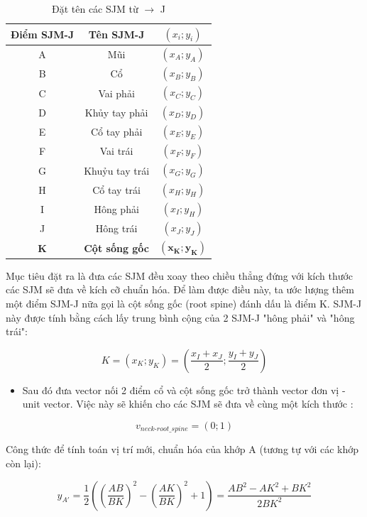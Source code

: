 \begin{table}[htp]
\centering
\caption{Đặt tên các SJM từ $\rightarrow$ J}
\begin{tabular}{|c|c|c|}
\hline 
 Điểm SJM-J & Tên SJM-J & $(x_i; y_i) $\\ 
\hline 
A & Mũi  & $(x_A; y_A)$ \\
\hline 
B & Cổ & $(x_B; y_B)$ \\ 
\hline 
C & Vai phải  & $(x_C; y_C)$ \\ 
\hline 
D & Khủy tay phải & $(x_D; y_D)$ \\ 
\hline 
E & Cổ tay phải & $(x_E; y_E)$ \\ 
\hline
F & Vai trái & $(x_F; y_F)$ \\ 
\hline
G & Khuỷu tay trái & $(x_G; y_G)$ \\ 
\hline
H & Cổ tay trái & $(x_H; y_H)$ \\ 
\hline
I &  Hông phải & $(x_I; y_H)$ \\
\hline
J & Hông trái & $(x_J; y_J)$ \\ 
\hline
\textbf{K} & \textbf{Cột sống gốc} & $\mathbf{(x_K; y_K)}$ \\ 
\hline
\end{tabular} 
\label{BangSJM}
\end{table}

Mục tiêu đặt ra là đưa các SJM đều xoay theo chiều thẳng đứng với kích thước các SJM sẽ đưa về kích cỡ chuẩn hóa. Để làm được điều này, ta ước lượng thêm một điểm SJM-J nữa gọi là cột sống gốc (root spine) đánh dấu là điểm K. SJM-J này được tính bằng cách lấy trung bình cộng của 2 SJM-J "hông phải" và "hông trái":

\begin{equation}
K = (x_K; y_K) = (\frac{x_I+x_J}{2};\frac{y_I+y_J}{2})
\end{equation}

\begin{itemize}
\item Sau đó đưa vector nối 2 điểm cổ và cột sống gốc trở thành vector đơn vị - unit vector. Việc này sẽ khiến cho các SJM sẽ đưa về cùng một kích thước :
\end{itemize}

\begin{equation}
v_\textit{neck-root\_spine} = (0;1)
\end{equation}

Công thức để tính toán vị trí mới, chuẩn hóa của khớp A (tương tự với các khớp còn lại):

\begin{equation}
{y_{A'}} = \frac{1}{2}\left( {{{\left( {\frac{{AB}}{{BK}}} \right)}^2} - {{\left( {\frac{{AK}}{{BK}}} \right)}^2} + 1} \right) = \frac{{A{B^2} - A{K^2} + B{K^2}}}{{2B{K^2}}}
\end{equation}

